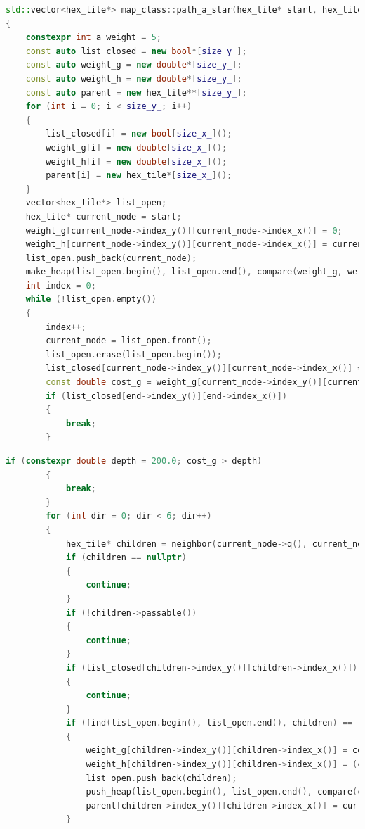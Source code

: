 \documentclass[french]{beamer}
\begin{document}
\begin{frame}
	\tiny		
		\begin{lstlisting}[language=C++,basicstyle=\ttfamily,keywordstyle=\color{red},breaklines=true]
std::vector<hex_tile*> map_class::path_a_star(hex_tile* start, hex_tile* end) const
{
	constexpr int a_weight = 5;
	const auto list_closed = new bool*[size_y_];
	const auto weight_g = new double*[size_y_];
	const auto weight_h = new double*[size_y_];
	const auto parent = new hex_tile**[size_y_];
	for (int i = 0; i < size_y_; i++)
	{
		list_closed[i] = new bool[size_x_]();
		weight_g[i] = new double[size_x_]();
		weight_h[i] = new double[size_x_]();
		parent[i] = new hex_tile*[size_x_]();
	}
	vector<hex_tile*> list_open;
	hex_tile* current_node = start;
	weight_g[current_node->index_y()][current_node->index_x()] = 0;
	weight_h[current_node->index_y()][current_node->index_x()] = current_node->distance(end) * a_weight;
	list_open.push_back(current_node);
	make_heap(list_open.begin(), list_open.end(), compare(weight_g, weight_h));
	int index = 0;
	while (!list_open.empty())
	{
		index++;
		current_node = list_open.front();
		list_open.erase(list_open.begin());
		list_closed[current_node->index_y()][current_node->index_x()] = true;
		const double cost_g = weight_g[current_node->index_y()][current_node->index_x()] + 1.0;
		if (list_closed[end->index_y()][end->index_x()])
		{
			break;
		}
\end{lstlisting}
\end{frame}

\begin{frame}
\tiny
\begin{lstlisting}[language=C++,basicstyle=\ttfamily,keywordstyle=\color{red},breaklines=true]
		if (constexpr double depth = 200.0; cost_g > depth)
		{
			break;
		}
		for (int dir = 0; dir < 6; dir++)
		{
			hex_tile* children = neighbor(current_node->q(), current_node->r(), dir);
			if (children == nullptr)
			{
				continue;
			}
			if (!children->passable())
			{
				continue;
			}
			if (list_closed[children->index_y()][children->index_x()])
			{
				continue;
			}
			if (find(list_open.begin(), list_open.end(), children) == list_open.end())
			{
				weight_g[children->index_y()][children->index_x()] = cost_g;
				weight_h[children->index_y()][children->index_x()] = (children->distance(end)) * a_weight;
				list_open.push_back(children);
				push_heap(list_open.begin(), list_open.end(), compare(compare(weight_g, weight_h)));
				parent[children->index_y()][children->index_x()] = current_node;
			}
\end{lstlisting}
\end{frame}
\end{document}
